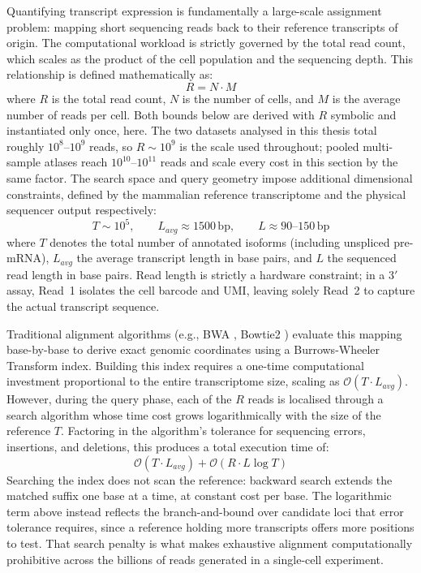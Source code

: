 Quantifying transcript expression is fundamentally a large-scale assignment problem: mapping short sequencing reads back to their reference transcripts of origin. The computational workload is strictly governed by the total read count, which scales as the product of the cell population and the sequencing depth. This relationship is defined mathematically as:
$$ R = N \cdot M $$
where $R$ is the total read count, $N$ is the number of cells, and $M$ is the average number of reads per cell. Both bounds below are derived with $R$ symbolic and instantiated only once, here. The two datasets analysed in this thesis total roughly $10^{8}$--$10^{9}$ reads, so $R \sim 10^{9}$ is the scale used throughout; pooled multi-sample atlases reach $10^{10}$--$10^{11}$ reads and scale every cost in this section by the same factor. The search space and query geometry impose additional dimensional constraints, defined by the mammalian reference transcriptome and the physical sequencer output respectively:
$$ T \sim 10^5, \qquad L_{avg} \approx 1500\,\text{bp}, \qquad L \approx 90\text{--}150\,\text{bp} $$
where $T$ denotes the total number of annotated isoforms (including unspliced pre-mRNA), $L_{avg}$ the average transcript length in base pairs, and $L$ the sequenced read length in base pairs. Read length is strictly a hardware constraint; in a $3'$ assay, Read~1 isolates the cell barcode and UMI, leaving solely Read~2 to capture the actual transcript sequence.

Traditional alignment algorithms (e.g., BWA \cite{li2009bwa}, Bowtie2 \cite{langmead2012bowtie2}) evaluate this mapping base-by-base to derive exact genomic coordinates using a Burrows-Wheeler Transform index. Building this index requires a one-time computational investment proportional to the entire transcriptome size, scaling as $\mathcal{O}(T \cdot L_{avg})$. However, during the query phase, each of the $R$ reads is localised through a search algorithm whose time cost grows logarithmically with the size of the reference $T$. Factoring in the algorithm's tolerance for sequencing errors, insertions, and deletions, this produces a total execution time of:
$$ \mathcal{O}(T \cdot L_{avg}) + \mathcal{O}(R \cdot L \log T) $$
Searching the index does not scan the reference: backward search extends the matched suffix one base at a time, at constant cost per base. The logarithmic term above instead reflects the branch-and-bound over candidate loci that error tolerance requires, since a reference holding more transcripts offers more positions to test. That search penalty is what makes exhaustive alignment computationally prohibitive across the billions of reads generated in a single-cell experiment.

